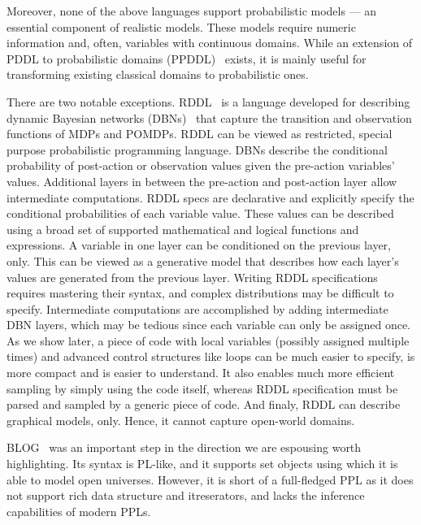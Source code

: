 \documentclass[letterpaper]{article} %
\theoremstyle{definition}
\begin{document}
Moreover, none of the above languages support probabilistic models --- an essential component of  realistic models. These models require numeric information and, often, variables with continuous domains.
While an extension of PDDL to
probabilistic domains (PPDDL)~\cite{YouLit04} exists, it is mainly useful for transforming existing classical domains to probabilistic ones. 

There are two notable exceptions. RDDL~\cite{RDDL} is a language developed for describing
dynamic Bayesian networks (DBNs)~\cite{DBN} that capture
the transition and observation functions of MDPs and
POMDPs. RDDL can be viewed as restricted, special purpose
probabilistic programming language. DBNs describe the conditional probability of post-action or observation values given the pre-action variables’ values.
Additional layers in between the pre-action and post-action layer allow intermediate computations. RDDL specs are declarative and explicitly specify the conditional probabilities of each variable value. 
These values can be described using a broad set of supported
mathematical and logical functions and expressions. 
A variable in one layer can be conditioned on the 
previous layer, only. This can be viewed as a generative model that describes how each layer's values are generated from the previous layer.
Writing RDDL specifications requires mastering their syntax, and complex distributions may be difficult to specify. Intermediate computations are accomplished by adding intermediate DBN layers, which may be tedious since each variable can only be assigned once. As we show
later, a piece of code with local variables (possibly
assigned multiple times) and advanced control structures like loops can be much easier to specify, is more compact and is easier to understand. It also enables much more efficient sampling by simply using the code itself, whereas 
RDDL specification must be parsed and sampled by a generic piece of code. And finaly, RDDL can describe graphical models, only. Hence, it cannot capture open-world domains.

BLOG~\cite{BLOG} was an important step in the direction we are espousing worth highlighting. Its syntax is  PL-like, and it supports set objects using which it is able to model open universes. However, it is short of a full-fledged PPL as it does not support rich data structure and itreserators, and lacks the inference capabilities of modern PPLs.
\end{document}
